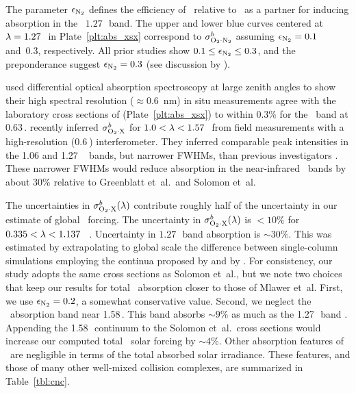 \documentclass[agupp,twoside]{aguplus} %
\begin{document}
The parameter $\epsilon_{\mathrm{N}_{2}}$ defines the efficiency of \Nd\ relative to
\Od\ as a partner for inducing absorption in the \Od\ $1.27$\,\um\
band. 
The upper and lower blue curves centered at $\lambda = 1.27$\,\um\ in
Plate~\ref{plt:abs_xsx} correspond to $\sigma^{b}_{\mathrm{O}_{2} \cdot \mathrm{N}_{2}}$ assuming $\epsilon_{\mathrm{N}_{2}} =
0.1$ and~0.3, respectively.
All prior studies show $0.1 \le \epsilon_{\mathrm{N}_{2}} \le 0.3$, and the preponderance 
suggest $\epsilon_{\mathrm{N}_{2}} = 0.3$ (see discussion by \cite{SPS98}).  


\cite{SPS98} used differential optical absorption spectroscopy at
large zenith angles to show their high spectral resolution ($\approx
0.6$~nm) in situ measurements agree with the laboratory
cross sections of \cite{GOB90} (Plate~\ref{plt:abs_xsx}) to within
0.3\% for the \OdOd\ band at 0.63\,\um.  
\cite{MCB98} recently inferred $\sigma^{b}_{\mathrm{O}_{2} \cdot \mathrm{X}}$ for $1.0 < \lambda < 1.57$\,\um\ 
from field measurements with a high-resolution ($0.6~$\xcm)
interferometer. 
They inferred comparable peak intensities in the 1.06 and 1.27\,\um\
\OdX\ bands, but narrower FWHMs, than previous investigators
\cite[]{SPS98}.
These narrower FWHMs would reduce absorption in the near-infrared
\OdX\ bands by about 30\% relative to Greenblatt et~al.\ and Solomon
et~al. 

The uncertainties in $\sigma^{b}_{\mathrm{O}_{2} \cdot \mathrm{X}}(\lambda)$ contribute roughly half of the 
uncertainty in our estimate of global \OdX\ forcing.
The uncertainty in $\sigma^{b}_{\mathrm{O}_{2} \cdot \mathrm{X}}(\lambda)$ is $< 10\%$ for $0.335 <
\lambda < 1.137$ \um\ \cite[]{GOB90}. 
Uncertainty in $1.27$\,\um\ band absorption is $\sim 30\%$. 
This was estimated by extrapolating to global scale the difference
between single-column simulations employing the continua proposed by
\cite{SPS98} and by \cite{MCB98}.
For consistency, our study adopts the same cross sections as
Solomon et~al., but we note two choices that keep our results for
total \OdX\ absorption closer to those of Mlawer et~al.
First, we use $\epsilon_{\mathrm{N}_{2}} = 0.2$, a somewhat conservative value.
Second, we neglect the \OdOd\ absorption band near 1.58\,\um.
This band absorbs $\sim 9\%$ as much as the 1.27\,\um\ band
\cite[]{MCB98}. 
Appending the 1.58\,\um\ continuum to the Solomon et~al.\
cross sections would increase our computed total \OdX\ solar forcing
by $\sim 4\%$. 
Other absorption features of \OdX\ are negligible in terms of the total
absorbed solar irradiance.
These features, and those of many other well-mixed collision
complexes, are summarized in Table~\ref{tbl:cnc}. 
\end{document}
